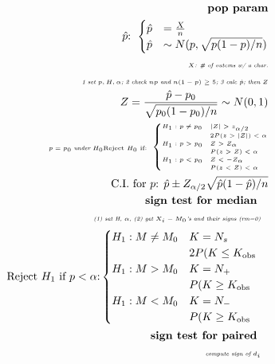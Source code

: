 \documentclass{article}
\newcommand{\note}[1]{\tiny\smash{\textit{#1}}}
\begin{document}
\begin{minipage}{0.48\textwidth}
	\begin{align*}
		\textbf{pop param} \\
		\text{$\hat p$: }
		\begin{cases}
			\hat p &= \frac{X}{n} \\
			\hat p &\sim N( p, \sqrt{ p(1-p) / n } )
		\end{cases} \\
		\note{$X$: \# of outcms w/ a char.} \\
		\note{1 set $p, H, \alpha$; }
		\note{2 check $np$ and $n(1-p) \ge 5$; }
		\note{3 calc $\hat p$; then $Z$} \\
		Z = \frac{ \hat p - p_0 }{ \sqrt{ p_0 (1-p_0) / n } } \sim N(0,1) \\
		\note{$p = p_0$ under $H_0$} 
		\text{Reject $H_0$ if: }
		\begin{cases}
			H_1 : p \ne p_0 & |Z| > z_{\alpha / 2 } \\
				& 2P(z>|Z|) < \alpha \\
			H_1 : p > p_0 & Z > Z_{\alpha} \\
				& P(z > Z) < \alpha \\
			H_1 : p < p_0 & Z < -Z_{\alpha} \\
				& P(z < Z) < \alpha
		\end{cases} \\
		\text{C.I. for $p$: } \hat p \pm Z_{\alpha / 2} \sqrt{
			\hat p (1 - \hat p)
			/
			n
		} \\
		\textbf{sign test for median} \quad \\
		\note{(1) set H, $\alpha$, (2) get $X_i - M_0$'s and their signs (rm=0)} \quad \\
		\text{Reject $H_1$ if $p < \alpha$:} \begin{cases}
			H_1 : M \ne M_0 & K = N_s \\
				& 2 P(K \le K_{\text{obs}} \\
			H_1 : M > M_0 & K = N_+ \\
				& P(K \ge K_{\text{obs}} \\
			H_1 : M < M_0 & K = N_- \\
				& P(K \ge K_{\text{obs}} \\
		\end{cases} \quad \\
		\textbf{sign test for paired} \quad \\
		\note{compute sign of $d_i$} \quad \\
	\end{align*}
\end{minipage}
\end{document}
